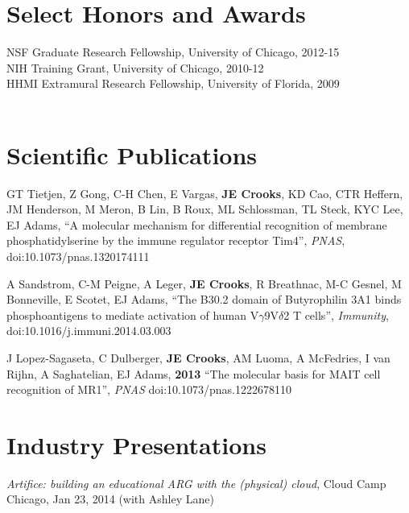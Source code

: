 \documentclass[margin,line]{resume}
\begin{document}
\begin{resume}
    \vspace{-2mm}

    \section{\mysidestyle Select Honors and Awards} 
    NSF Graduate Research Fellowship, University of Chicago, 2012-15 \vspace{1mm} \\
    NIH Training Grant, University of Chicago, 2010-12 \vspace{1mm}\\
    HHMI Extramural Research Fellowship, University of Florida, 2009  \vspace{1mm}\\
    \vspace{-8mm}\\

    \section{\mysidestyle Scientific Publications}
    GT Tietjen, Z Gong, C-H Chen, E Vargas, \textbf{JE Crooks}, KD Cao, CTR Heffern, JM Henderson, M Meron, B Lin, B Roux, ML Schlossman, TL Steck, KYC Lee, EJ Adams,
    ``A molecular mechanism for differential recognition of membrane phosphatidylserine by the immune regulator receptor Tim4'',
    \textsl{PNAS}, doi:10.1073/pnas.1320174111
    \vspace{-3mm}

    A Sandstrom, C-M Peigne, A Leger, \textbf{JE Crooks}, R Breathnac, M-C Gesnel, M Bonneville, E Scotet, EJ Adams,
    ``The B30.2 domain of Butyrophilin 3A1 binds phosphoantigens to mediate activation of human V$\gamma$9V$\delta$2 T cells'',
    \textsl{Immunity}, doi:10.1016/j.immuni.2014.03.003
    \vspace{-3mm}

    \pagebreak

    J Lopez-Sagaseta, C Dulberger, \textbf{JE Crooks}, AM Luoma, A McFedries, I van Rijhn, A Saghatelian, EJ Adams, 
    \textbf{2013}
    ``The molecular basis for MAIT cell recognition of MR1'',
    \textsl{PNAS} doi:10.1073/pnas.1222678110

    \vspace{-2mm}

    \section{\mysidestyle Industry Presentations}
    \emph{Artifice: building an educational ARG with the (physical) cloud}, Cloud Camp Chicago, Jan 23, 2014 (with Ashley Lane)
    \vspace{-2mm}

\end{resume}
\end{document}
